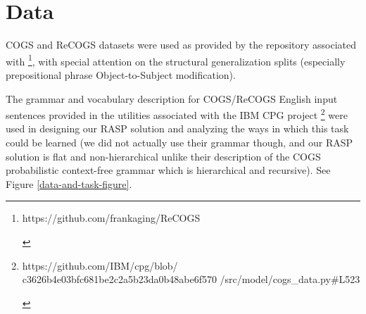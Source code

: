 \documentclass[11pt]{article}
\begin{document}
%
%
%

\section{Data}

COGS \cite{KimLinzen2020} and ReCOGS \cite{Wu2023} datasets were used as provided by the repository associated with \cite{Wu2023}\footnote{\begin{footnotesize}https://github.com/frankaging/ReCOGS
\end{footnotesize}},
with special attention on the structural generalization splits (especially prepositional phrase Object-to-Subject modification).

The grammar and vocabulary description for COGS/ReCOGS English input sentences provided in the utilities associated with the IBM CPG project \cite{klinger2024compositionalprogramgenerationfewshot}\footnote{\begin{footnotesize}https://github.com/IBM/cpg/blob/
c3626b4e03bfc681be2c2a5b23da0b48abe6f570
/src/model/cogs\_data.py\#L523
\end{footnotesize}}
were used in designing our RASP solution and analyzing the ways in which this task could be learned (we did not actually use their grammar though, and our RASP solution is flat and non-hierarchical unlike their description of the COGS probabilistic context-free grammar which is hierarchical and recursive). See Figure \ref{data-and-task-figure}.
\end{document}
